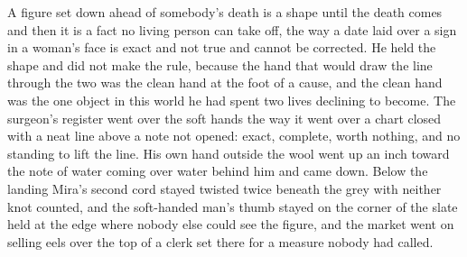 A figure set down ahead of somebody's death is a shape until the death comes and then it is a fact no living person can take off, the way a date laid over a sign in a woman's face is exact and not true and cannot be corrected. He held the shape and did not make the rule, because the hand that would draw the line through the two was the clean hand at the foot of a cause, and the clean hand was the one object in this world he had spent two lives declining to become. The surgeon's register went over the soft hands the way it went over a chart closed with a neat line above a note not opened: exact, complete, worth nothing, and no standing to lift the line. His own hand outside the wool went up an inch toward the note of water coming over water behind him and came down. Below the landing Mira's second cord stayed twisted twice beneath the grey with neither knot counted, and the soft-handed man's thumb stayed on the corner of the slate held at the edge where nobody else could see the figure, and the market went on selling eels over the top of a clerk set there for a measure nobody had called.
